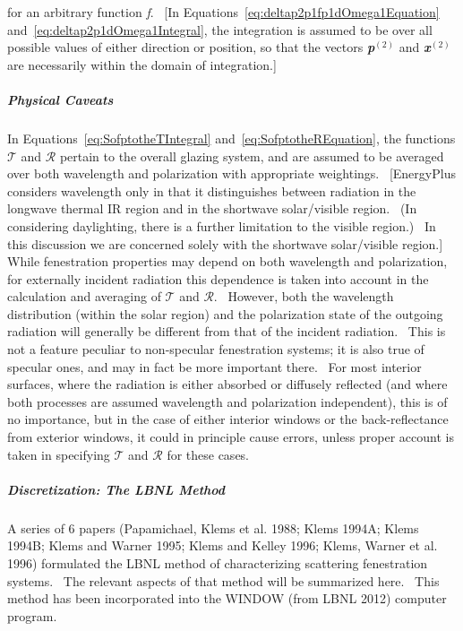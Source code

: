 for an arbitrary function \emph{f}.~ {[}In Equations~\ref{eq:deltap2p1fp1dOmega1Equation} and~\ref{eq:deltap2p1dOmega1Integral}, the integration is assumed to be over all possible values of either direction or position, so that the vectors \textbf{\emph{p}}\(^{(2)}\) and \textbf{\emph{x}}\(^{(2)}\) are necessarily within the domain of integration.{]}

\subparagraph{Physical Caveats}\label{physical-caveats}

In Equations~\ref{eq:SofptotheTIntegral} and~\ref{eq:SofptotheREquation}, the functions $\mathcal{T}$ and $\mathcal{R}$ pertain to the overall glazing system, and are assumed to be averaged over both wavelength and polarization with appropriate weightings.~ {[}EnergyPlus considers wavelength only in that it distinguishes between radiation in the longwave thermal IR region and in the shortwave solar/visible region.~ (In considering daylighting, there is a further limitation to the visible region.)~ In this discussion we are concerned solely with the shortwave solar/visible region.{]}~ While fenestration properties may depend on both wavelength and polarization, for externally incident radiation this dependence is taken into account in the calculation and averaging of $\mathcal{T}$ and $\mathcal{R}$.~ However, both the wavelength distribution (within the solar region) and the polarization state of the outgoing radiation will generally be different from that of the incident radiation.~ This is not a feature peculiar to non-specular fenestration systems; it is also true of specular ones, and may in fact be more important there.~ For most interior surfaces, where the radiation is either absorbed or diffusely reflected (and where both processes are assumed wavelength and polarization independent), this is of no importance, but in the case of either interior windows or the back-reflectance from exterior windows, it could in principle cause errors, unless proper account is taken in specifying $\mathcal{T}$ and $\mathcal{R}$ for these cases.

\subparagraph{Discretization: The LBNL Method}\label{discretization-the-lbnl-method}

A series of 6 papers (Papamichael, Klems et al. 1988; Klems 1994A; Klems 1994B; Klems and Warner 1995; Klems and Kelley 1996; Klems, Warner et al. 1996) formulated the LBNL method of characterizing scattering fenestration systems.~ The relevant aspects of that method will be summarized here.~ This method has been incorporated into the WINDOW (from LBNL 2012) computer program.

